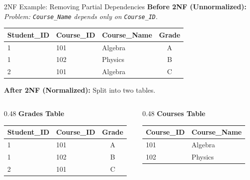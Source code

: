 \documentclass[aspectratio=169]{beamer}
\begin{document}
\begin{frame}{2NF Example: Removing Partial Dependencies}
    \textbf{Before 2NF (Unnormalized):} \\
    \textit{Problem: \texttt{Course\_Name} depends only on \texttt{Course\_ID}.}
    \begin{center}
        \small
        \begin{tabular}{lllc}
            \toprule
            \textbf{Student\_ID} & \textbf{Course\_ID} & \textbf{Course\_Name} & \textbf{Grade} \\
            \midrule
            1 & 101 & Algebra & A \\
            1 & 102 & Physics & B \\
            2 & 101 & Algebra & C \\
            \bottomrule
        \end{tabular}
    \end{center}

    \vspace{0.2cm}
    \textbf{After 2NF (Normalized):} Split into two tables.
    \begin{columns}[T]
        \begin{column}{0.48\textwidth}
            \textbf{Grades Table}
            \begin{center}
                \small
                \begin{tabular}{llc}
                    \toprule
                    \textbf{Student\_ID} & \textbf{Course\_ID} & \textbf{Grade} \\
                    \midrule
                    1 & 101 & A \\
                    1 & 102 & B \\
                    2 & 101 & C \\
                    \bottomrule
                \end{tabular}
            \end{center}
        \end{column}

        \begin{column}{0.48\textwidth}
            \textbf{Courses Table}
            \begin{center}
                \small
                \begin{tabular}{ll}
                    \toprule
                    \textbf{Course\_ID} & \textbf{Course\_Name} \\
                    \midrule
                    101 & Algebra \\
                    102 & Physics \\
                    \bottomrule
                \end{tabular}
            \end{center}
        \end{column}
    \end{columns}
\end{frame}
\end{document}
